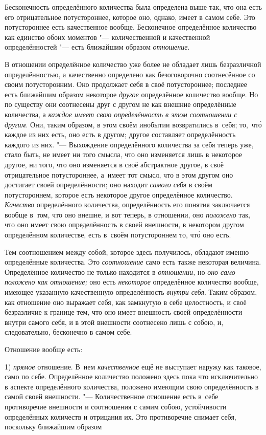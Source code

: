 Бесконечность определённого количества была определена выше так, что она
есть его отрицательное потустороннее, которое оно, однако, имеет в самом
себе. Это потустороннее есть качественное вообще. Бесконечное определённое
количество как единство обоих моментов "--- количественной и качественной
определённостей "--- есть ближайшим образом {\em отношение}.

В отношении определённое количество уже более не обладает лишь безразличной
определённостью, а качественно определено как безоговорочно соотнесённое со
своим потусторонним. Оно продолжает себя в своё потустороннее; последнее есть
ближайшим образом некоторое {\em другое} определённое количество вообще. Но по
существу они соотнесены друг с другом не как внешние определённые количества, а
{\em каждое имеет свою определённость в этом соотношении с другим}. Они, таким
образом, в этом своём инобытии возвратились в~себя; то,~чт\'{о} каждое из них
есть, оно есть в другом; другое составляет определённость каждого из них. "---
Выхождение определённого количества за себя теперь уже, стало быть, не имеет ни
того смысла, что оно изменяется лишь в некоторое другое, ни того, что оно
изменяется в своё абстрактное другое, в своё отрицательное потустороннее,
а~имеет тот смысл, что в этом другом оно достигает своей определённости; оно
находит {\em самого себя} в своём потустороннем, которое есть некоторое другое
определённое количество. {\em Качество} определённого количества,
определённость его понятия заключается вообще в~том, что оно внешне, и вот
теперь, в отношении, оно {\em положено} так, что оно имеет свою определённость
в своей внешности, в некотором другом определённом количестве, есть в~своём
потустороннем то, чт\'{о} оно есть.

Тем соотношением между собой, которое здесь получилось, обладают именно
определённые количества. Это {\em соотношение} само есть также некоторая
величина. Определённое количество не только находится в {\em отношении,} но
{\em оно само положено как отношение;} оно есть {\em некоторое} определённое
количество вообще, имеющее указанную качественную определённость
{\em внутри себя}. Таким образом, как отношение оно выражает себя, как
замкнутую в себе целостность, и своё безразличие к границе тем, что оно имеет
внешность своей определённости внутри самого себя, и в этой внешности
соотнесено лишь с собою, и, следовательно, бесконечно в самом себе.

Отношение вообще есть:

1) {\em прямое} отношение. В~нем {\em качественное} ещё не выступает наружу как
таковое, само по себе. Определённое количество положено здесь пока что
исключительно в аспекте определённого количества, положено имеющим свою
определённость в самой своей внешности. "--- Количественное отношение есть
в~себе противоречие внешности и соотношения с самим собою, устойчивости
определённых количеств и отрицания их. Это противоречие снимает себя, поскольку
ближайшим образом

